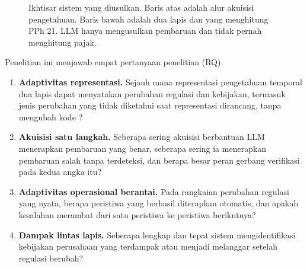 \begin{figure}[t]
\caption{Ikhtisar sistem yang diusulkan. Baris atas adalah alur akuisisi pengetahuan. Baris bawah adalah  dua lapis dan  yang menghitung PPh 21. LLM hanya mengusulkan pembaruan dan tidak pernah menghitung pajak.}
\label{fig:ikhtisar}
\end{figure}

Penelitian ini menjawab empat pertanyaan penelitian (RQ).
\begin{enumerate}[label=\textbf{RQ\arabic*},leftmargin=*,nosep]
  \item \textbf{Adaptivitas representasi.} Sejauh mana representasi pengetahuan temporal dua lapis dapat menyatakan perubahan regulasi dan kebijakan, termasuk jenis perubahan yang tidak diketahui saat representasi dirancang, tanpa mengubah kode ?
  \item \textbf{Akuisisi satu langkah.} Seberapa sering akuisisi berbantuan LLM menerapkan pembaruan yang benar, seberapa sering ia menerapkan pembaruan salah tanpa terdeteksi, dan berapa besar peran gerbang verifikasi pada kedua angka itu?
  \item \textbf{Adaptivitas operasional berantai.} Pada rangkaian perubahan regulasi yang nyata, berapa peristiwa yang berhasil diterapkan otomatis, dan apakah kesalahan merambat dari satu peristiwa ke peristiwa berikutnya?
  \item \textbf{Dampak lintas lapis.} Seberapa lengkap dan tepat sistem mengidentifikasi kebijakan perusahaan yang terdampak atau menjadi melanggar setelah regulasi berubah?
\end{enumerate}

